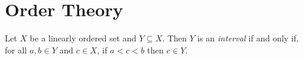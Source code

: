 \section{Order Theory}

\begin{definition}[Interval]
    Let $X$ be a linearly ordered set and $Y \subseteq X$. Then $Y$ is an \emph{interval} if and only if, for
    all $a, b \in Y$ and $c \in X$, if $a < c < b$ then $c \in Y$.
\end{definition}